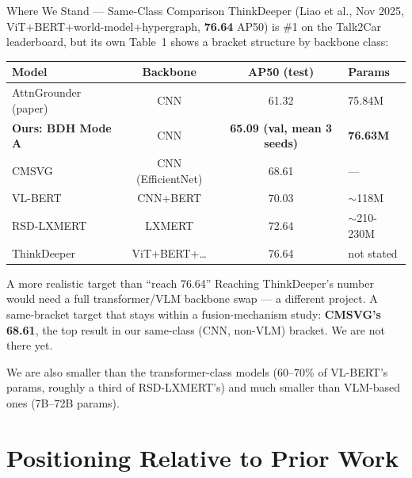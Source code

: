 \documentclass[aspectratio=169]{beamer}
\begin{document}
\begin{frame}{Where We Stand — Same-Class Comparison}
  \small ThinkDeeper (Liao et al., Nov 2025, ViT+BERT+world-model+hypergraph,
  \textbf{76.64} AP50) is \#1 on the Talk2Car leaderboard, but its own Table~1
  shows a bracket structure by backbone class:
  \begin{table}
    \centering\footnotesize
    \begin{tabular}{lccl}
      \toprule
      Model & Backbone & AP50 (test) & Params \\
      \midrule
      AttnGrounder (paper) & CNN & 61.32 & 75.84M \\
      \textbf{Ours: BDH Mode A} & CNN & \textbf{65.09 (val, mean 3 seeds)} & \textbf{76.63M} \\
      CMSVG & CNN (EfficientNet) & 68.61 & --- \\
      VL-BERT & CNN+BERT & 70.03 & $\sim$118M \\
      RSD-LXMERT & LXMERT & 72.64 & $\sim$210-230M \\
      ThinkDeeper & ViT+BERT+\ldots & 76.64 & not stated \\
      \bottomrule
    \end{tabular}
  \end{table}
  \begin{block}{A more realistic target than ``reach 76.64''}
    Reaching ThinkDeeper's number would need a full transformer/VLM
    backbone swap — a different project. A same-bracket target that
    stays within a fusion-mechanism study: \textbf{CMSVG's 68.61},
    the top result in our same-class (CNN, non-VLM) bracket. We are not
    there yet.
  \end{block}
  \small We are also smaller than the transformer-class models
  (60--70\% of VL-BERT's params, roughly a third of RSD-LXMERT's) and
  much smaller than VLM-based ones (7B--72B params).
\end{frame}

\section{Positioning Relative to Prior Work}
\end{document}
